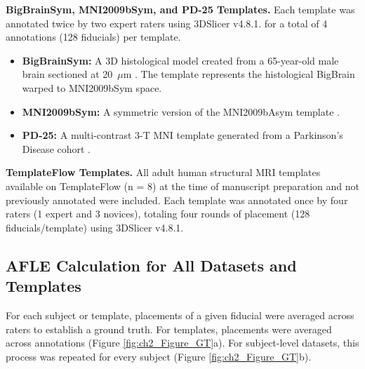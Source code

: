 \textbf{BigBrainSym, MNI2009bSym, and PD-25 Templates.} Each template was annotated twice by two expert raters using 3DSlicer v4.8.1. for a total of 4 annotations (128 fiducials) per template. 

\begin{itemize}
    \item \textbf{BigBrainSym:} A 3D histological model created from a 65-year-old male brain sectioned at 20~$\mu$m \cite{Amunts2013-vu}. The template represents the histological BigBrain warped to MNI2009bSym space.
    \item \textbf{MNI2009bSym:} A symmetric version of the MNI2009bAsym template \cite{Fonov2009-oi}.
    \item \textbf{PD-25:} A multi-contrast 3-T MNI template generated from a Parkinson's Disease cohort \cite{Xiao2017-zp}.
\end{itemize}


\textbf{TemplateFlow Templates.} All adult human structural MRI templates available on TemplateFlow (n = 8) at the time of manuscript preparation and not previously annotated were included\cite{Ciric2022-bo}. Each template was annotated once by four raters (1 expert and 3 novices), totaling four rounds of placement (128 fiducials/template) using 3DSlicer v4.8.1.

\subsection{AFLE Calculation for All Datasets and Templates}
For each subject or template, placements of a given fiducial were averaged across raters to establish a ground truth. For templates, placements were averaged across annotations (Figure \ref{fig:ch2_Figure_GT}a). For subject-level datasets, this process was repeated for every subject (Figure \ref{fig:ch2_Figure_GT}b).

